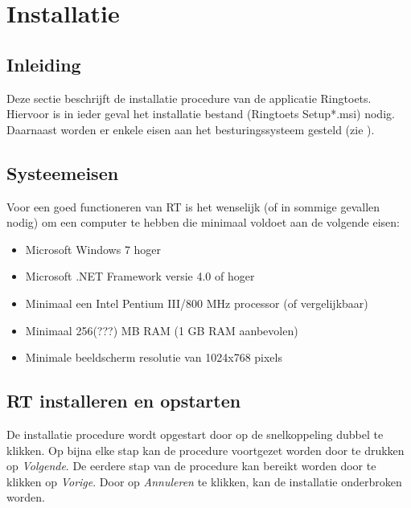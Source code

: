 
\chapter{Installatie\label{chap:install}}

\section{Inleiding}
Deze sectie beschrijft de installatie procedure van de applicatie Ringtoets. Hiervoor is in ieder geval het installatie bestand (Ringtoets Setup*.msi) nodig. Daarnaast worden er enkele eisen aan het besturingssysteem gesteld (zie ). 

\section{Systeemeisen}
\label{sec:sysrequirements}
Voor een goed functioneren van RT is het wenselijk (of in sommige gevallen nodig) om een computer te hebben die minimaal voldoet aan de volgende eisen:
\begin{itemize}
	\item Microsoft Windows 7 hoger
	\item Microsoft .NET Framework versie 4.0 of hoger
	\item Minimaal een Intel Pentium III/800 MHz processor (of vergelijkbaar)
	\item Minimaal 256(???) MB RAM (1 GB RAM aanbevolen)
	\item Minimale beeldscherm resolutie van 1024x768 pixels
\end{itemize}




\section{RT installeren en opstarten}
\label{sec:rtinstall}
De installatie procedure wordt opgestart door op de snelkoppeling dubbel te klikken. Op bijna elke stap kan de procedure voortgezet worden door te drukken op \textit{Volgende}. De eerdere stap van de procedure kan bereikt worden door te klikken op \textit{Vorige}. Door op \textit{Annuleren} te klikken, kan de installatie onderbroken worden. 

